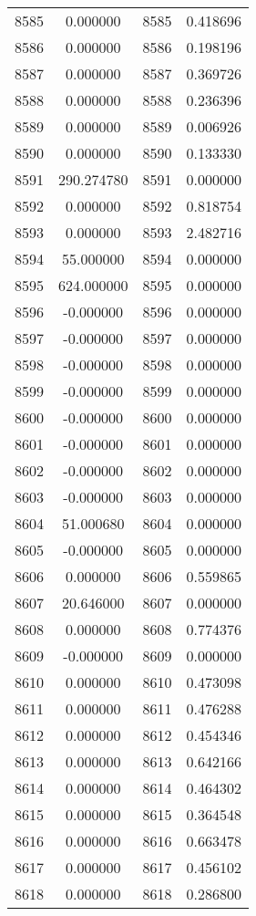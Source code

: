 \documentclass[12pt]{article}
\begin{document}
\begin{longtable}{@{}cccc@{}}
8585 & 0.000000 & 8585 & 0.418696 \\
8586 & 0.000000 & 8586 & 0.198196 \\
8587 & 0.000000 & 8587 & 0.369726 \\
8588 & 0.000000 & 8588 & 0.236396 \\
8589 & 0.000000 & 8589 & 0.006926 \\
8590 & 0.000000 & 8590 & 0.133330 \\
8591 & 290.274780 & 8591 & 0.000000 \\
8592 & 0.000000 & 8592 & 0.818754 \\
8593 & 0.000000 & 8593 & 2.482716 \\
8594 & 55.000000 & 8594 & 0.000000 \\
8595 & 624.000000 & 8595 & 0.000000 \\
8596 & -0.000000 & 8596 & 0.000000 \\
8597 & -0.000000 & 8597 & 0.000000 \\
8598 & -0.000000 & 8598 & 0.000000 \\
8599 & -0.000000 & 8599 & 0.000000 \\
8600 & -0.000000 & 8600 & 0.000000 \\
8601 & -0.000000 & 8601 & 0.000000 \\
8602 & -0.000000 & 8602 & 0.000000 \\
8603 & -0.000000 & 8603 & 0.000000 \\
8604 & 51.000680 & 8604 & 0.000000 \\
8605 & -0.000000 & 8605 & 0.000000 \\
8606 & 0.000000 & 8606 & 0.559865 \\
8607 & 20.646000 & 8607 & 0.000000 \\
8608 & 0.000000 & 8608 & 0.774376 \\
8609 & -0.000000 & 8609 & 0.000000 \\
8610 & 0.000000 & 8610 & 0.473098 \\
8611 & 0.000000 & 8611 & 0.476288 \\
8612 & 0.000000 & 8612 & 0.454346 \\
8613 & 0.000000 & 8613 & 0.642166 \\
8614 & 0.000000 & 8614 & 0.464302 \\
8615 & 0.000000 & 8615 & 0.364548 \\
8616 & 0.000000 & 8616 & 0.663478 \\
8617 & 0.000000 & 8617 & 0.456102 \\
8618 & 0.000000 & 8618 & 0.286800 \\

\end{longtable}
\end{document}

